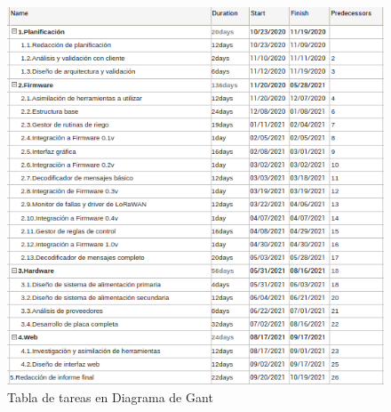 \documentclass[11pt]{charter}
\begin{document}


\begin{figure}[htpb]
\centering 
\includegraphics[width=\textwidth]{./Figuras/gantT.png}
\caption{Tabla de tareas en Diagrama de Gant}
\label{fig:redLoRa}
\end{figure}
\end{document}
